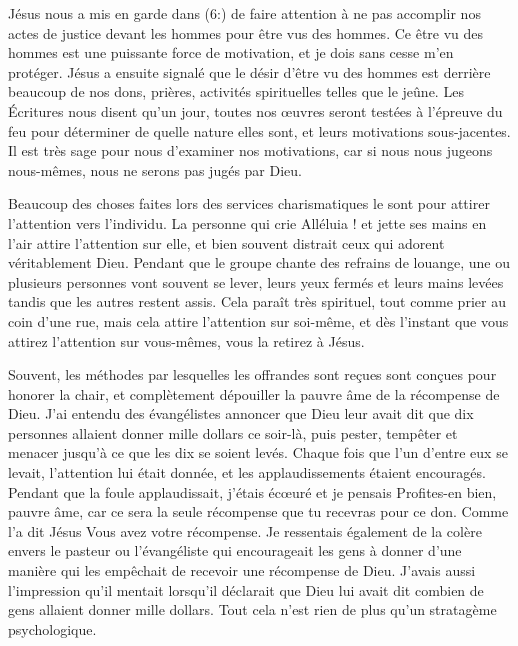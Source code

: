 Jésus nous a mis en garde dans (6:) de faire attention
 à ne pas accomplir nos actes de justice devant les hommes
 pour être vus des hommes. Ce \Og être vu des hommes \Fg{} est une
 puissante force de motivation, et je dois sans cesse m'en protéger.
 Jésus a ensuite signalé que le désir d'être vu des hommes
 est derrière beaucoup de nos dons, prières, activités spirituelles
 telles que le jeûne. Les Écritures nous disent qu'un jour,
 toutes nos œuvres seront testées à l'épreuve du feu pour déterminer
 de quelle nature elles sont, et leurs motivations sous-jacentes.
 Il est très sage pour nous d'examiner nos motivations,
 car si nous nous jugeons nous-mêmes, nous ne serons pas jugés par Dieu.

Beaucoup des choses faites lors des services charismatiques
 le sont pour attirer l'attention vers l'individu.
 La personne qui crie \Og Alléluia ! \Fg{} et jette ses mains en l'air
 attire l'attention sur elle, et bien souvent distrait ceux qui adorent
 véritablement Dieu. Pendant que le groupe chante des refrains de louange,
 une ou plusieurs personnes vont souvent se lever, leurs yeux fermés
 et leurs mains levées tandis que les autres restent assis.
 Cela paraît très spirituel, tout comme prier au coin d'une rue,
 mais cela attire l'attention sur soi-même, et dès l'instant
 que vous attirez l'attention sur vous-mêmes, vous la retirez à Jésus.

Souvent, les méthodes par lesquelles les offrandes sont reçues
 sont conçues pour honorer la chair, et complètement dépouiller
 la pauvre âme de la récompense de Dieu. J'ai entendu des évangélistes
 annoncer que Dieu leur avait dit que dix personnes allaient donner
 mille dollars ce soir-là, puis pester, tempêter et menacer jusqu'à
 ce que les dix se soient levés. Chaque fois que l'un d'entre eux
 se levait, l'attention lui était donnée, et les applaudissements
 étaient encouragés. Pendant que la foule applaudissait,
 j'étais écœuré et je pensais\frcolon{} \Og Profites-en bien, pauvre âme,
 car ce sera la seule récompense que tu recevras pour ce don. \Fg{}
 Comme l'a dit Jésus\frcolon{} \Og Vous avez votre récompense. \Fg{}
 Je ressentais également de la colère envers le pasteur
 ou l'évangéliste qui encourageait les gens à donner d'une manière
 qui les empêchait de recevoir une récompense de Dieu.
 J'avais aussi l'impression qu'il mentait lorsqu'il déclarait
 que Dieu lui avait dit combien de gens allaient donner mille dollars.
 Tout cela n'est rien de plus qu'un stratagème psychologique.


